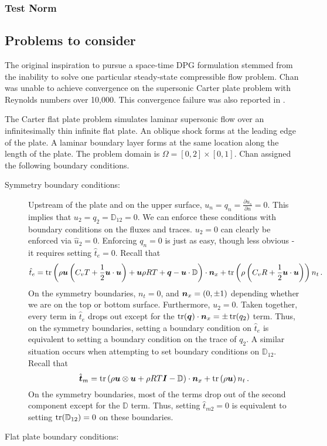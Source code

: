 \documentclass[Proposal.tex]{subfiles}
\begin{document}
\subsubsection{Test Norm}

\subsection{Problems to consider}
The original inspiration to pursue a space-time DPG formulation stemmed from the inability to solve one particular steady-state compressible flow problem.
Chan\cite{JesseDissertation} was unable to achieve convergence on the supersonic Carter plate problem\cite{Carter1973} with Reynolds numbers over 10,000.
This convergence failure was also reported in \cite{KirkDissertation}.

The Carter flat plate problem simulates laminar supersonic flow over an infinitesimally thin infinite flat plate.
An oblique shock forms at the leading edge of the plate. 
A laminar boundary layer forms at the same location along the length of the plate.
The problem domain is $\Omega=[0,2]\times[0,1]$.
Chan assigned the following boundary conditions.
\begin{description}
	\item[Symmetry boundary conditions:] Upstream of the plate and on the upper surface, $u_n=q_n=\frac{\partial u_s}{\partial n}=0$.
	This implies that $u_2=q_2=\mathbb{D}_{12}=0$. 
	We can enforce these conditions with boundary conditions on the fluxes and traces. $u_2=0$ can clearly be enforced via $\hat u_2=0$.
	Enforcing $q_n=0$ is just as easy, though less obvious - it requires setting $\hat t_e=0$.
	Recall that 
	\begin{equation*}
	\hat t_e=\operatorname*{tr}\left( \rho\boldsymbol u\left( C_v T+\frac{1}{2}\boldsymbol u\cdot\boldsymbol u \right)+\boldsymbol u\rho RT+\boldsymbol q-\boldsymbol u\cdot\mathbb{D} \right)\cdot\boldsymbol n_x
	+\operatorname*{tr}\left( \rho\left( C_v R+\frac{1}{2}\boldsymbol u\cdot\boldsymbol u \right) \right)n_t\,.
	\end{equation*}
	On the symmetry boundaries, $n_t=0$, and $\boldsymbol n_x=(0,\pm1)$ depending whether we are on the top or bottom surface. 
	Furthermore, $u_2=0$. Taken together, every term in $\hat t_e$ drops out except for the $\operatorname*{tr}(\boldsymbol q)\cdot\boldsymbol n_x=\pm\operatorname*{tr}(q_2)$ term.
	Thus, on the symmetry boundaries, setting a boundary condition on $\hat t_e$ is equivalent to setting a boundary condition on the trace of $q_2$.
	A similar situation occurs when attempting to set boundary conditions on $\mathbb{D}_{12}$. Recall that
	\begin{equation*}
	\hat{\boldsymbol t}_m=\operatorname*{tr}\left( \rho\boldsymbol u\otimes\boldsymbol u+\rho RT\boldsymbol I-\mathbb{D} \right)\cdot\boldsymbol n_x
	+\operatorname*{tr}\left( \rho\boldsymbol u \right) n_t\,.
	\end{equation*}
	On the symmetry boundaries, most of the terms drop out of the second component except for the $\mathbb{D}$ term.
	Thus, setting $\hat t_{m2}=0$ is equivalent to setting $\operatorname*{tr}(\mathbb{D}_{12})=0$ on these boundaries.
	\item[Flat plate boundary conditions:]

\end{description}
\end{document}
